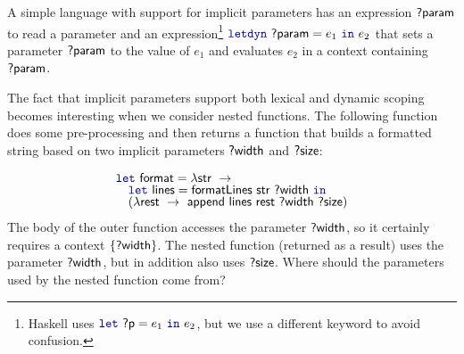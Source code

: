A simple language with support for implicit parameters has an expression $\textnormal{\sffamily ?param}$ to read a
parameter and an expression\footnote{Haskell uses $\kvd{let}~\ident{?p} = e_1~\kvd{in}~e_2$, but we use a
different keyword to avoid confusion.} $\kvd{letdyn}~\ident{?param} = e_1~\kvd{in}~e_2$ that sets a
parameter $\textnormal{\sffamily ?param}$ to the value of $e_1$ and evaluates $e_2$ in a context containing
$\textnormal{\sffamily ?param}$.

The fact that implicit parameters support both lexical and dynamic scoping becomes interesting
when we consider nested functions. The following function does some pre-processing and then returns a
function that builds a formatted string based on two implicit parameters $\textnormal{\sffamily ?width}$ and
$\textnormal{\sffamily ?size}$:

\begin{equation*}
\begin{array}{l}
\kvd{let}~\ident{format} = \lambda \ident{str}~\rightarrow \\[-0.25em]
\quad \kvd{let}~\ident{lines} = \ident{formatLines}~\ident{str}~\ident{?width}~\kvd{in}\\[-0.25em]
\quad (\lambda \ident{rest}~\rightarrow~\ident{append}~
         \ident{lines}~\ident{rest}~\ident{?width}~\ident{?size})
\end{array}
\end{equation*}
%
The body of the outer function accesses the parameter $\textnormal{\sffamily ?width}$, so it certainly requires a context
$\{ \textnormal{\sffamily ?width} \}$. The nested function (returned as a result) uses the parameter
$\textnormal{\sffamily ?width}$, but in addition also uses $\textnormal{\sffamily ?size}$. Where should the parameters used by the
nested function come from?

